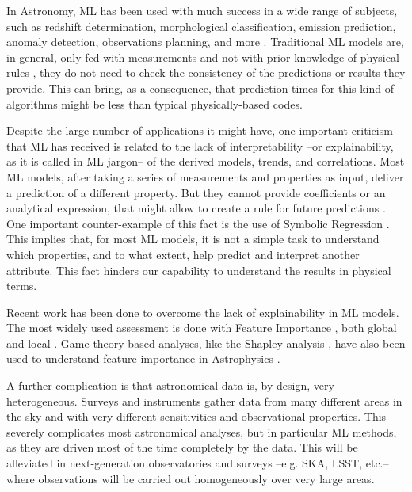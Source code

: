 \documentclass{aa}
\begin{document}
In Astronomy, ML has been used with much success in a wide range of subjects, such as redshift determination, morphological classification, emission prediction, anomaly detection, observations planning, and more \citep[][]{2010IJMPD..19.1049B, 2019arXiv190407248B}. 
Traditional ML models are, in general, only fed with measurements and not with prior knowledge of physical rules \citep{Desai2021}, they do not need to check the consistency of the predictions or results they provide. This can bring, as a consequence, that prediction times for this kind of algorithms might be less than typical physically-based codes.

Despite the large number of applications it might have, one important criticism that ML has received is related to the lack of interpretability --or explainability, as it is called in ML jargon-- of the derived models, trends, and correlations. Most ML models, after taking a series of measurements and properties as input, deliver a prediction of a different property. But they cannot provide coefficients or an analytical expression, that might allow to create a rule for future predictions \citep{goebel2018explainable}. One important counter-example of this fact is the use of Symbolic Regression \citep[e.g.][]{2020arXiv200611287C, 2021ApJ...915...71V}. This implies that, for most ML models, it is not a simple task to understand which properties, and to what extent, help predict and interpret another attribute. This fact hinders our capability to understand the results in physical terms.

Recent work has been done to overcome the lack of explainability in ML models. The most widely used assessment is done with Feature Importance \citep{10.1007/978-3-030-10925-7_40, 9007737}, both global and local \citep{Saarela2021}. Game theory based analyses, like the Shapley analysis \citep{Shapley_article}, have also been used to understand feature importance in Astrophysics \citep[e.g.][]{2021MNRAS.507.1468M, 2022MNRAS.515.5285D, 2021Galax...9...86C, 2022MNRAS.509.3441A, 2022MNRAS.516.4716A}. 

A further complication is that astronomical data is, by design, very heterogeneous. 
Surveys and instruments gather data from many different areas in the sky and with very different sensitivities and observational properties. This severely complicates most astronomical analyses, but in particular ML methods, as they are driven most of the time completely by the data.
This will be alleviated in next-generation observatories and surveys --e.g. SKA, LSST, etc.-- where observations will be carried out homogeneously over very large areas.
\end{document}

